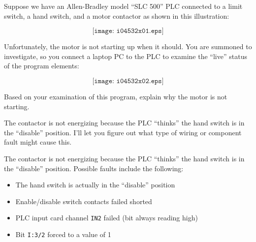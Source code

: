 

Suppose we have an Allen-Bradley model ``SLC 500'' PLC connected to a limit switch, a hand switch, and a motor contactor as shown in this illustration:

$$\texttt{[image: i04532x01.eps]}$$

Unfortunately, the motor is not starting up when it should.  You are summoned to investigate, so you connect a laptop PC to the PLC to examine the ``live'' status of the program elements:

$$\texttt{[image: i04532x02.eps]}$$

Based on your examination of this program, explain why the motor is not starting.







The contactor is not energizing because the PLC ``thinks'' the hand switch is in the ``disable'' position.  I'll let you figure out what type of wiring or component fault might cause this.







The contactor is not energizing because the PLC ``thinks'' the hand switch is in the ``disable'' position.  Possible faults include the following:

\begin{itemize}
\item{} The hand switch is actually in the ``disable'' position
\item{} Enable/disable switch contacts failed shorted
\item{} PLC input card channel {\tt IN2} failed (bit always reading high)
\item{} Bit {\tt I:3/2} forced to a value of 1
\end{itemize}











\vfil \eject


